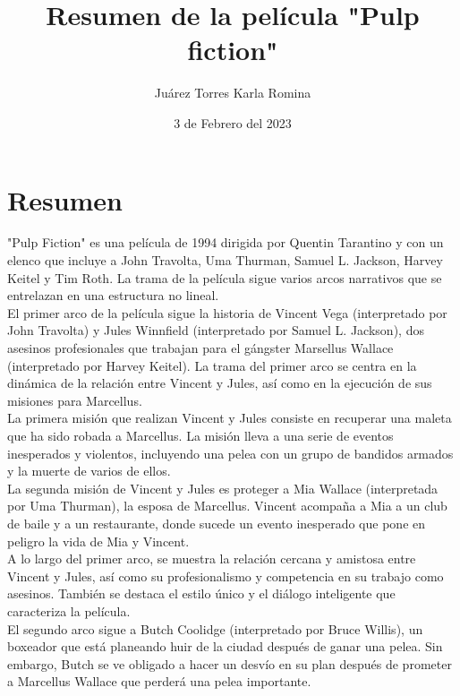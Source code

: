 \documentclass{article}
\title{Resumen de la película "Pulp fiction"}
\author{Juárez Torres Karla Romina}
\date{3 de Febrero del 2023}
\begin{document}
\maketitle

\section*{Resumen}

"Pulp Fiction" es una película de 1994 dirigida por Quentin Tarantino y con un elenco que incluye a John Travolta, Uma Thurman, Samuel L. Jackson, Harvey Keitel y Tim Roth. La trama de la película sigue varios arcos narrativos que se entrelazan en una estructura no lineal.\\

 El primer arco de la película sigue la historia de Vincent Vega (interpretado por John Travolta) y Jules Winnfield (interpretado por Samuel L. Jackson), dos asesinos profesionales que trabajan para el gángster Marsellus Wallace (interpretado por Harvey Keitel). La trama del primer arco se centra en la dinámica de la relación entre Vincent y Jules, así como en la ejecución de sus misiones para Marcellus.\\

 La primera misión que realizan Vincent y Jules consiste en recuperar una maleta que ha sido robada a Marcellus. La misión lleva a una serie de eventos inesperados y violentos, incluyendo una pelea con un grupo de bandidos armados y la muerte de varios de ellos.\\

La segunda misión de Vincent y Jules es proteger a Mia Wallace (interpretada por Uma Thurman), la esposa de Marcellus. Vincent acompaña a Mia a un club de baile y a un restaurante, donde sucede un evento inesperado que pone en peligro la vida de Mia y Vincent.\\

A lo largo del primer arco, se muestra la relación cercana y amistosa entre Vincent y Jules, así como su profesionalismo y competencia en su trabajo como asesinos. También se destaca el estilo único y el diálogo inteligente que caracteriza la película.\\

El segundo arco sigue a Butch Coolidge (interpretado por Bruce Willis), un boxeador que está planeando huir de la ciudad después de ganar una pelea. Sin embargo, Butch se ve obligado a hacer un desvío en su plan después de prometer a Marcellus Wallace que perderá una pelea importante.\\
\end{document}
